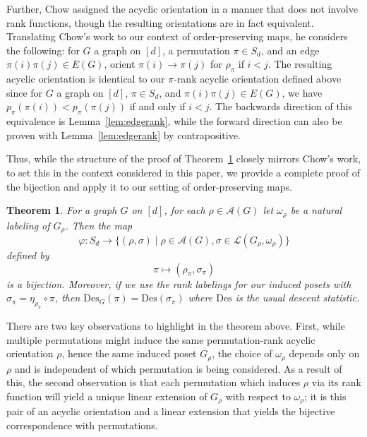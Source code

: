 \documentclass[11pt]{amsart}
\newtheorem{theorem}{Theorem}  [section] \numberwithin{equation}{section}
\newcommand{\rk}[1][\pi]{p_{#1}}
\newcommand{\des}{\mathrm{Des}}
\newcommand{\acyclic}[1]{\mathcal{A}(#1)}
\begin{document}
Further, Chow assigned the acyclic orientation in a manner that does not involve rank functions, though the resulting orientations are in fact equivalent.
Translating Chow's work to our context of order-preserving maps, he considers the following: for $G$ a graph on $[d]$, a permutation $\pi \in S_d$, and an edge $\pi(i)\pi(j) \in E(G)$, orient $\pi(i) \to \pi(j)$ for $\rho_\pi$ if $i <j$.
The resulting acyclic orientation is identical to our $\pi$-rank acyclic orientation defined above since for $G$ a graph on $[d]$, $\pi \in S_d$, and $\pi(i)\pi(j) \in E(G)$, we have $\rk(\pi(i)) < \rk(\pi(j))$ if and only if $i <j$. 
The backwards direction of this equivalence is Lemma~\ref{lem:edgerank}, while the forward direction can also be proven with Lemma~\ref{lem:edgerank} by contrapositive. 

Thus, while the structure of the proof of Theorem~\ref{thm:bijectiongstats} closely mirrors Chow's work, to set
this in the context considered in this paper, we provide a complete proof of the bijection and apply it to our setting of order-preserving maps.

\begin{theorem}\label{thm:bijectiongstats}
    For a graph $G$ on $[d]$, for each $\rho \in \acyclic{G}$ let $\omega_\rho$ be  a natural labeling of
$G_\rho$. Then the map
    \[
        \varphi: S_d \to\{(\rho,\sigma) \mid \rho \in \mathcal{A}(G), \sigma \in \mathcal{L}(G_\rho,\omega_\rho) \}
    \]
    defined by
    \[
    \pi \mapsto (\rho_\pi, \sigma_\pi)
    \]
is a bijection.
    Moreover, if we use the rank labelings for our induced posets with $\sigma_\pi = \eta_{\rho_\pi} \circ \pi$, then $\des_G(\pi) = \des(\sigma_\pi)$ where $\des$ is the usual descent statistic.
\end{theorem}

There are two key observations to highlight in the theorem above.
First, while multiple permutations might induce the same permutation-rank acyclic orientation $\rho$, hence the same induced poset $G_\rho$, the choice of $\omega_\rho$ depends only on $\rho$ and is independent of which permutation is being considered.
As a result of this, the second observation is that each permutation which induces $\rho$ via its rank function will yield a unique linear extension of $G_\rho$ with respect to $\omega_\rho$; it is this pair of an acyclic orientation and a linear extension that yields the bijective correspondence with permutations.
\end{document}
